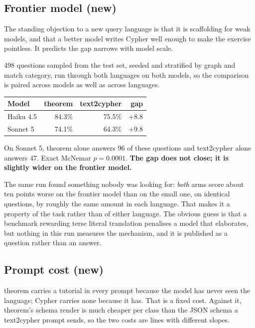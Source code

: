 \documentclass[11pt]{article}
\begin{document}
\subsection{Frontier model (new)}

The standing objection to a new query language is that it is scaffolding for
weak models, and that a better model writes Cypher well enough to make the
exercise pointless. It predicts the gap narrows with model scale.

498 questions sampled from the test set, seeded and stratified by graph and
match category, run through both languages on both models, so the comparison is
paired across models as well as across languages.

\begin{center}
\begin{tabular}{lrrr}
\toprule
Model & theorem & text2cypher & gap \\
\midrule
Haiku 4.5 & 84.3\% & 75.5\% & $\mathbf{+8.8}$ \\
Sonnet 5  & 74.1\% & 64.3\% & $\mathbf{+9.8}$ \\
\bottomrule
\end{tabular}
\end{center}

On Sonnet 5, theorem alone answers 96 of these questions and text2cypher alone
answers 47. Exact McNemar $p = 0.0001$. \textbf{The gap does not close; it is
slightly wider on the frontier model.}

The same run found something nobody was looking for: \emph{both} arms score about
ten points worse on the frontier model than on the small one, on identical
questions, by roughly the same amount in each language. That makes it a property
of the task rather than of either language. The obvious guess is that a benchmark
rewarding terse literal translation penalises a model that elaborates, but
nothing in this run measures the mechanism, and it is published as a question
rather than an answer.

\subsection{Prompt cost (new)}

theorem carries a tutorial in every prompt because the model has never seen the
language; Cypher carries none because it has. That is a fixed cost. Against it,
theorem's schema render is much cheaper per class than the JSON schema a
text2cypher prompt sends, so the two costs are lines with different slopes.
\end{document}
